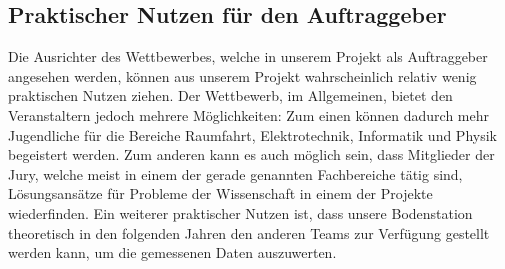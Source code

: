 \subsection{Praktischer Nutzen für den Auftraggeber}
Die Ausrichter des Wettbewerbes, welche in unserem Projekt als Auftraggeber angesehen werden, können aus unserem Projekt wahrscheinlich relativ wenig praktischen Nutzen ziehen. Der Wettbewerb, im Allgemeinen, bietet den Veranstaltern jedoch mehrere Möglichkeiten: Zum einen können dadurch mehr Jugendliche für die Bereiche Raumfahrt, Elektrotechnik, Informatik und Physik begeistert werden. Zum anderen kann es auch möglich sein, dass Mitglieder der Jury, welche meist in einem der gerade genannten Fachbereiche tätig sind, Lösungsansätze für Probleme der Wissenschaft in einem der Projekte wiederfinden. Ein weiterer praktischer Nutzen ist, dass unsere Bodenstation theoretisch in den folgenden Jahren den anderen Teams zur Verfügung gestellt werden kann, um die gemessenen Daten auszuwerten.


